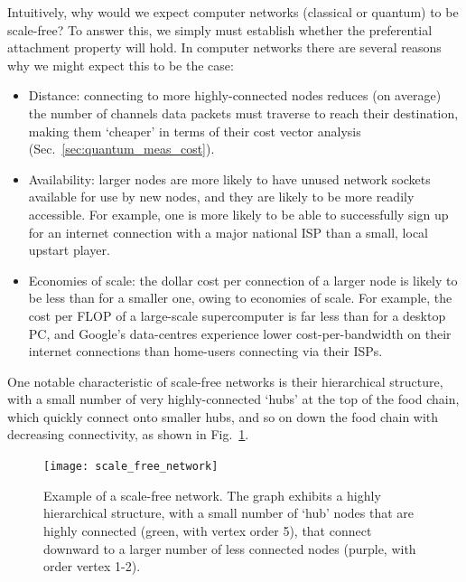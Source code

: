 Intuitively, why would we expect computer networks (classical or quantum) to be scale-free? To answer this, we simply must establish whether the preferential attachment property will hold. In computer networks there are several reasons why we might expect this to be the case:
\begin{itemize}
	\item Distance: connecting to more highly-connected nodes reduces (on average) the number of channels data packets must traverse to reach their destination, making them `cheaper' in terms of their cost vector analysis (Sec.~\ref{sec:quantum_meas_cost}).
	\item Availability: larger nodes are more likely to have unused network sockets available for use by new nodes, and they are likely to be more readily accessible. For example, one is more likely to be able to successfully sign up for an internet connection with a major national ISP than a small, local upstart player.
	\item Economies of scale: the dollar cost per connection of a larger node is likely to be less than for a smaller one, owing to economies of scale. For example, the cost per FLOP of a large-scale supercomputer is far less than for a desktop PC, and Google's data-centres experience lower cost-per-bandwidth on their internet connections than home-users connecting via their ISPs.
\end{itemize}

One notable characteristic of scale-free networks is their hierarchical structure, with a small number of very highly-connected `hubs' at the top of the food chain, which quickly connect onto smaller hubs, and so on down the food chain with decreasing connectivity, as shown in Fig.~\ref{fig:scale_free_net}.

\begin{figure}[!htbp]
\texttt{[image: scale\_free\_network]}
\caption{Example of a scale-free network. The graph exhibits a highly hierarchical structure, with a small number of `hub' nodes that are highly connected (green, with vertex order 5), that connect downward to a larger number of less connected nodes (purple, with order vertex 1-2).}\label{fig:scale_free_net}
\end{figure}

